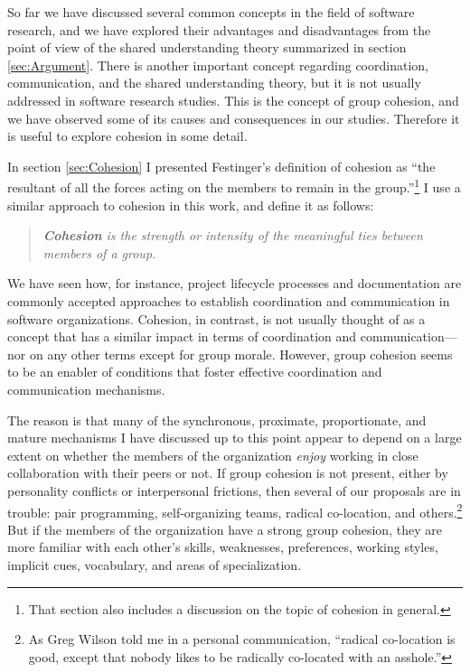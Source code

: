 So far we have discussed several common concepts in the field of software research, and we have explored their advantages and disadvantages from the point of view of the shared understanding theory summarized in section \ref{sec:Argument}. There is another important concept regarding coordination, communication, and the shared understanding theory, but it is not usually addressed in software research studies. This is the concept of group cohesion, and we have observed some of its causes and consequences in our studies. Therefore it is useful to explore cohesion in some detail.

In section \ref{sec:Cohesion} I presented Festinger's  definition of cohesion as ``the resultant of all the forces acting on the members to remain in the group.''\footnote{That section also includes a discussion on the topic of cohesion in general.} I use a similar approach to cohesion in this work, and define it as follows:

\begin{quote}
\emph{\textbf{Cohesion} is the strength or intensity of the meaningful ties between members of a group.}
\end{quote}

We have seen how, for instance, project lifecycle processes and documentation are commonly accepted approaches to establish coordination and communication in software organizations. Cohesion, in contrast, is not usually thought of as a concept that has a similar impact in terms of coordination and communication---nor on any other terms except for group morale. However, group cohesion seems to be an enabler of conditions that foster effective coordination and communication mechanisms.

The reason is that many of the synchronous, proximate, proportionate, and mature mechanisms I have discussed up to this point appear to depend on a large extent on whether the members of the organization \emph{enjoy} working in close collaboration with their peers or not. If group cohesion is not present, either by personality conflicts or interpersonal frictions, then several of our proposals are in trouble: pair programming, self-organizing teams, radical co-location, and others.\footnote{As Greg Wilson told me in a personal communication, ``radical co-location is good, except that nobody likes to be radically co-located with an asshole.''} But if the members of the organization have a strong group cohesion, they are more familiar with each other's skills, weaknesses, preferences, working styles, implicit cues, vocabulary, and areas of specialization.

